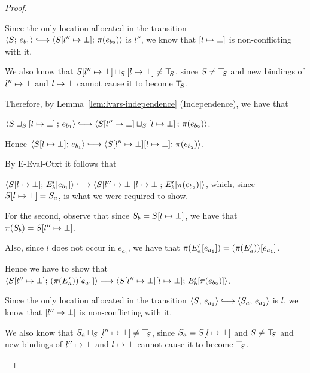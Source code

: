 \begin{proof}
\begin{enumerate}
\begin{enumerate}
\begin{itemize}
        Since the only location allocated in the transition
        $\config{S}{e_{b_1}} \parstepsto
        \config{\extSRaw{S}{l''}{\bot}}{\pi(e_{b_2})}$ is $l''$, we
        know that $\left[ l \mapsto \bot \right]$ is
        non-conflicting with it.

        We also know that
        $S[l'' \mapsto \bot] \sqcup_{S} \left[ l \mapsto \bot \right]
        \neq \top\hspace{-0.85mm}_{S}$, since $S \neq \top\hspace{-0.85mm}_{S}$ and new bindings of
        $l'' \mapsto \bot$ and $l \mapsto \bot$
        cannot cause it to become $\top\hspace{-0.85mm}_{S}$.

        Therefore, by Lemma~\ref{lem:lvars-independence}
        (Independence), we have that

        $\config{\lubstore{S}{\store{\storebindingRaw{l}{\bot}}}}{e_{b_1}}
        \parstepsto
        \config{\lubstore{\extSRaw{S}{l''}{\bot}}{\store{\storebindingRaw{l}{\bot}}}}{\pi(e_{b_2})}$.

        Hence $\config{\extSRaw{S}{l}{\bot}}{e_{b_1}} \parstepsto
        \config{\extSRaw{\extSRaw{S}{l''}{\bot}}{l}{\bot}}{\pi(e_{b_2})}$.

        By {\sc E-Eval-Ctxt} it follows that

        $\config{\extSRaw{S}{l}{\bot}}{\evalctxt{E'_b}{e_{b_1}}}
        \parstepsto
        \config{\extSRaw{\extSRaw{S}{l''}{\bot}}{l}{\bot}}{\evalctxt{E'_b}{\pi(e_{b_2})}}$,
        which, since $S[l \mapsto \bot] = S_a$, is what we were
        required to show.

        For the second, observe that since $S_b =
        S[l \mapsto \bot]$, we have that $\pi(S_b) =
        S[l'' \mapsto \bot]$.

        Also, since $l$ does not occur in $e_{a_1}$, we have that
        $\pi(E'_a\hspace{-0.5mm}\left[e_{a_1}\right]) =
        (\pi(E'_a))\hspace{-0.5mm}\left[e_{a_1}\right]$.

        Hence we have to show that
        $\langle S[l'' \mapsto \bot];\, (\pi(E'_a))\hspace{-0.5mm}\left[e_{a_1}\right] \rangle
        \longmapsto
        \langle S[l'' \mapsto \bot][l \mapsto \bot];\, E'_b\hspace{-0.5mm}\left[\pi(e_{b_2})\right] \rangle$.

        Since the only location allocated in the transition
        $\config{S}{e_{a_1}} \parstepsto \config{S_a}{e_{a_2}}$ is
        $l$, we know that $\left[ l'' \mapsto \bot \right]$ is
        non-conflicting with it.

        We also know that
        $S_a \sqcup_{S} \left[ l'' \mapsto \bot \right] \neq
        \top\hspace{-0.85mm}_{S}$, since $S_a = S[l \mapsto \bot]$ and $S \neq \top\hspace{-0.85mm}_{S}$
        and new bindings of $l'' \mapsto \bot$ and
        $l \mapsto \bot$ cannot cause it to become $\top\hspace{-0.85mm}_{S}$.


\end{itemize}
\end{enumerate}
\end{enumerate}
\end{proof}
